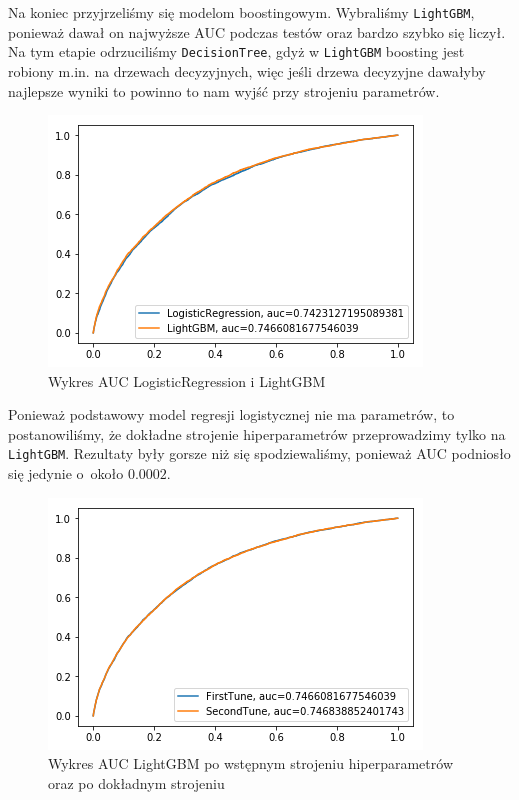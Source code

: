 \documentclass[12pt]{article}
\begin{document}
\newpage

Na koniec przyjrzeliśmy się modelom boostingowym. Wybraliśmy \texttt{LightGBM}, ponieważ dawał on najwyższe AUC podczas testów oraz bardzo szybko się liczył. Na tym etapie odrzuciliśmy \texttt{DecisionTree}, gdyż w \texttt{LightGBM} boosting jest robiony m.in. na drzewach decyzyjnych, więc jeśli drzewa decyzyjne dawałyby najlepsze wyniki to powinno to nam wyjść przy strojeniu parametrów.

\begin{figure}[h!]
\centering
\includegraphics[scale=0.7]{LogisticLGBM.png}
\caption{Wykres AUC LogisticRegression i LightGBM}
\end{figure}

Ponieważ podstawowy model regresji logistycznej nie ma parametrów, to postanowiliśmy, że dokładne strojenie hiperparametrów przeprowadzimy tylko na \texttt{LightGBM}. Rezultaty były gorsze niż się spodziewaliśmy, ponieważ AUC podniosło się jedynie o~około $0.0002$.

\begin{figure}[h!]
\centering
\includegraphics[scale=0.7]{LGBMTuned.png}
\caption{Wykres AUC LightGBM po wstępnym strojeniu hiperparametrów oraz po dokładnym strojeniu}
\end{figure}
\end{document}
